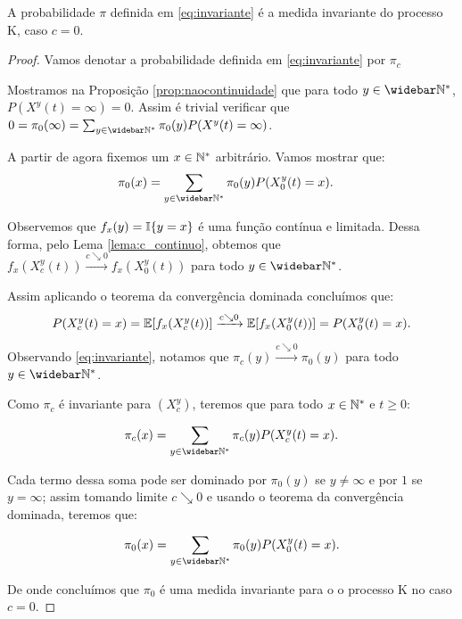 \begin{proposicao}
  A probabilidade $\pi$ definida em \eqref{eq:invariante} é a medida
  invariante do processo K, caso $c = 0$.
\end{proposicao}
\begin{proof}

  Vamos denotar a probabilidade definida em \eqref{eq:invariante} por
  $\pi_c$

  Mostramos na Proposição \ref{prop:naocontinuidade} que para todo $y
  \in \Nzb$, $P(X^y(t) = \infty) = 0$. Assim é trivial verificar que
  $0 = \pi_0(\infty) = \sum_{y\in\Nzb} \pi_0(y) P(X^y(t) =
  \infty)$.

  A partir de agora fixemos um $x \in {\mathbb{N^*}}$ arbitrário. Vamos mostrar que:
  \begin{align*}
    \pi_0(x) &= \sum_{y \in \Nzb} \pi_0 (y) P(X^y_0 (t) = x).
  \end{align*}

  Observemos que $f_x(y) = {\mathbb{I}}\{y = x\}$ é uma função contínua e
  limitada. Dessa forma, pelo Lema \ref{lema:c_continuo}, obtemos que
  $f_x(X^y_c(t)) \xrightarrow{c\searrow 0} f_x(X^y_0(t))$ \qc para
  todo $y\in\Nzb$.


  Assim aplicando o teorema da convergência dominada concluímos que:
  \begin{displaymath}
    P(X^y_c (t) = x) = {\mathbb{E}} [f_x(X^y_c(t))]
    \xrightarrow{c\searrow0}
    {\mathbb{E}} [f_x(X^y_0(t))] = P(X^y_0(t) = x).
  \end{displaymath}

  Observando \eqref{eq:invariante}, notamos que $\pi_c(y)
  \xrightarrow{c\searrow 0} \pi_0(y)$ para todo $y \in \Nzb$.

  Como $\pi_c$ é invariante para $(X^y_c)$, teremos que para todo $x
  \in {\mathbb{N^*}}$ e $t \geq 0$:

  \begin{align*}
    \pi_c(x) &= \sum_{y \in \Nzb} \pi_c (y) P(X^y_c (t) = x).\\
  \end{align*}


  Cada termo dessa soma pode ser dominado por $\pi_0(y)$ se $y \neq
  \infty$ e por $1$ se $y = \infty$; assim tomando limite $c\searrow0$
  e usando o teorema da convergência dominada, teremos que:

  \begin{align*}
    \pi_0(x) &= \sum_{y \in \Nzb} \pi_0 (y) P(X^y_0 (t) = x).\\
  \end{align*}

  De onde concluímos que $\pi_0$ é uma medida invariante para o o
  processo K no caso $c = 0$.
\end{proof}


